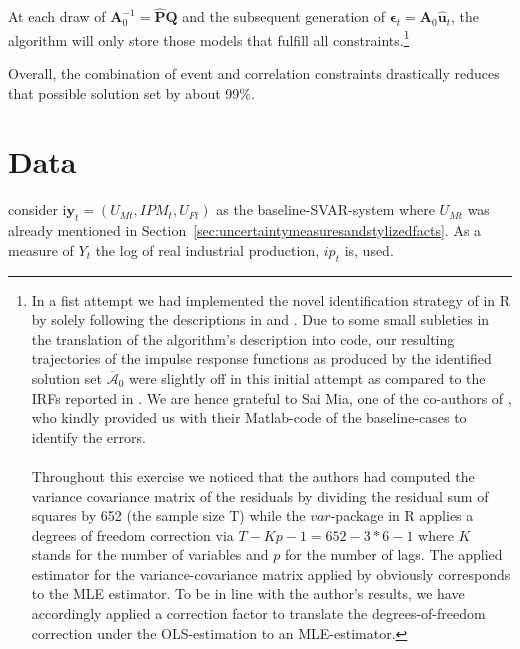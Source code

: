 \documentclass[a4paper,11pt,listof=nochaptergap,oneside,pointednumbers,bibtotoc,bigheadings,liststotoc]{scrbook}
\theoremstyle{mysatz}
\theoremstyle{mydefinition}
\theoremstyle{mytheorem}
\theoremstyle{mybemerkung}
\let\oldhat\hat
\newcommand{\vect}[1]{\boldsymbol{\mathbf{#1}}}
\newcommand{\hatt}[1]{\oldhat{\boldsymbol{\mathbf{#1}}}}
\begin{document}
At each draw of $\vect{A}_0^{-1} = \hatt{\vect{P}}\vect{Q}$ and the subsequent generation of $\vect{\epsilon}_t = \vect{A}_0\hatt{\vect{u}}_t$, the algorithm will only store those models that fulfill all constraints.\footnote{In a fist attempt we had implemented the novel identification strategy of \citet{ludvigsonetal:18} in R by solely following the descriptions in \citet{ludvigsonetal:18} and \citet{ludvigsonetal:17}. Due to some small subleties in the translation of the algorithm's description into code, our resulting trajectories of the impulse response functions as produced by the identified solution set $\overline{\vect{\mathcal{A}}}_0$ were slightly off in this initial attempt as compared to the IRFs reported in \citet{ludvigsonetal:18}. We are hence grateful to Sai Mia, one of the co-authors of \citet{ludvigsonetal:18}, who kindly provided us with their Matlab-code of the baseline-cases to identify the errors.\\
\\
Throughout this exercise we noticed that the authors had computed the variance covariance matrix of the residuals by dividing the residual sum of squares by 652 (the sample size T) while the $var$-package in R applies a degrees of freedom correction via $T-Kp-1 = 652 - 3*6 - 1$ where $K$ stands for the number of variables and $p$ for the number of lags. The applied estimator for the variance-covariance matrix applied by \citet{ludvigsonetal:18} obviously corresponds to the MLE estimator. To be in line with the author's results, we have accordingly applied a correction factor to translate the degrees-of-freedom correction under the OLS-estimation to an MLE-estimator.\label{ftn:MatlabCodeFootnote}}

Overall, the combination of event and correlation constraints drastically reduces that possible solution set by about 99\%.


\chapter{Data}
\label{sec:Data}

\citet{ludvigsonetal:18} consider i$\vect{y}_t = (U_{Mt}, IPM_{t}, U_{Ft})$ as the baseline-SVAR-system where $U_{Mt}$ was already mentioned in Section~\ref{sec:uncertaintymeasuresandstylizedfacts}. As a measure of $Y_t$ the log of real industrial production, $ip_t$ is, used. \\
\end{document}
